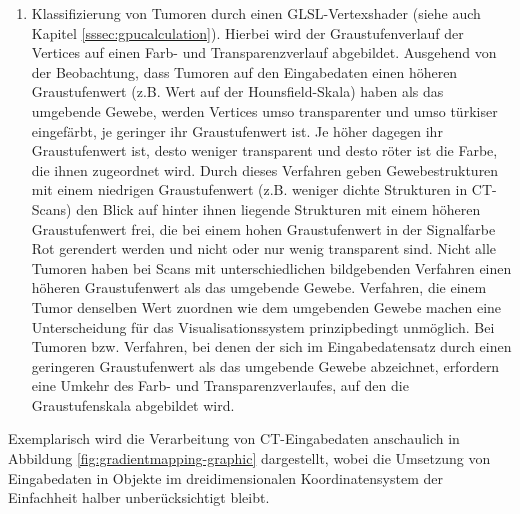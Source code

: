 \documentclass[pdftex,a4paper,titlepage,12pt]{scrartcl}
\newtheorem[L]{boxedDefinition}{Definition}
\begin{document}
\begin{enumerate}
 \item Klassifizierung von Tumoren durch einen GLSL-Vertexshader (siehe auch Kapitel \vref{sssec:gpucalculation}). Hierbei wird der Graustufenverlauf der Vertices auf einen Farb- und Transparenzverlauf abgebildet. Ausgehend von der Beobachtung, dass Tumoren auf den Eingabedaten einen höheren Graustufenwert (z.B. Wert auf der Hounsfield-Skala) haben als das umgebende Gewebe, werden Vertices umso transparenter und umso türkiser eingefärbt, je geringer ihr Graustufenwert ist. Je höher dagegen ihr Graustufenwert ist, desto weniger transparent und desto röter ist die Farbe, die ihnen zugeordnet wird. Durch dieses Verfahren geben Gewebestrukturen mit einem niedrigen Graustufenwert (z.B. weniger dichte Strukturen in CT-Scans) den Blick auf hinter ihnen liegende Strukturen mit einem höheren Graustufenwert frei, die bei einem hohen Graustufenwert in der Signalfarbe Rot gerendert werden und nicht oder nur wenig transparent sind. Nicht alle Tumoren haben bei Scans mit unterschiedlichen bildgebenden Verfahren einen höheren Graustufenwert als das umgebende Gewebe. Verfahren, die einem Tumor denselben Wert zuordnen wie dem umgebenden Gewebe machen eine Unterscheidung für das Visualisationssystem prinzipbedingt unmöglich. Bei Tumoren bzw. Verfahren, bei denen der sich im Eingabedatensatz durch einen geringeren Graustufenwert als das umgebende Gewebe abzeichnet, erfordern eine Umkehr des Farb- und Transparenzverlaufes, auf den die Graustufenskala abgebildet wird.
\end{enumerate}
Exemplarisch wird die Verarbeitung von CT-Eingabedaten anschaulich in Abbildung \vref{fig:gradientmapping-graphic} dargestellt, wobei die Umsetzung von Eingabedaten in Objekte im dreidimensionalen Koordinatensystem der Einfachheit halber unberücksichtigt bleibt.
\end{document}
